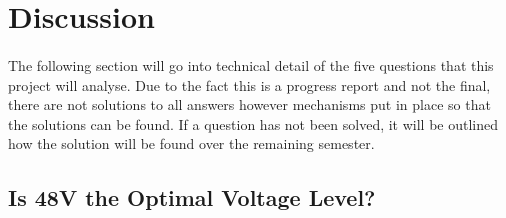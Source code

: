 \section{Discussion}

\paragraph{}
The following section will go into technical detail of the five questions that this project will analyse. Due to the fact this is a progress report and not the final, there are not solutions to all answers however mechanisms put in place so that the solutions can be found. If a question has not been solved, it will be outlined how the solution will be found over the remaining semester. 

\subsection{Is 48V the Optimal Voltage Level?}